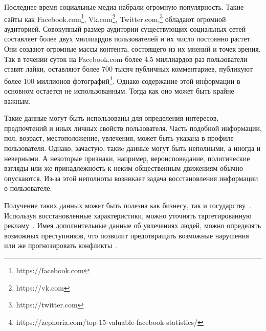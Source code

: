 \documentclass[annotation,times,page4]{itmo-student-thesis}
\begin{document}

\makemastertitle

\tableofcontents

\startprefacepage

Последнее время социальные медиа набрали огромную популярность. Такие сайты как Facebook.com\footnote{https://facebook.com}, Vk.com\footnote{https://vk.com}, Twitter.com,\footnote{https://twitter.com} обладают огромной аудиторией. Совокупный размер аудитории существующих социальных сетей составляет более двух миллиардов пользователей и их число постоянно растет. Они создают огромные массы контента, состоящего из их мнений и точек зрения. Так в течении суток на Facebook.com более 4.5 миллиардов раз пользователи ставят лайки, оставляют более 700 тысяч публичных комментариев, публикуют более 100 миллионов фотографий\footnote{https://zephoria.com/top-15-valuable-facebook-statistics/}. Однако содержание этой информации в основном остается не использованным. Тогда как оно может быть крайне важным.

Такие данные могут быть использованы для определения интересов, предпочтений и иных личных свойств пользователя. Часть подобной информации, пол, возраст,  местоположение, увлечения, может быть указана в профиле пользователя. Однако, зачастую, такиe данные могут быть неполными, а иногда и неверными. А некоторые признаки, например, вероисповедание, политические взгляды или же принадлежность к неким общественным движениям обычно опускаются. Из-за этой неполноты возникает задача восстановления информации о пользователе.

Получение таких данных может быть полезна как бизнесу, так и государству~\cite{ramakrishnan2014beating}. Используя восстановленные характеристики, можно уточнять таргетированную рекламу~\cite{swearingen2001beyond}. Имея дополнительные данные об увлечениях людей, можно определять возможных преступников, что позволит предотвращать возможные нарушения или же прогнозировать конфликты~\cite{grothoff2016nsa}.
\end{document}
